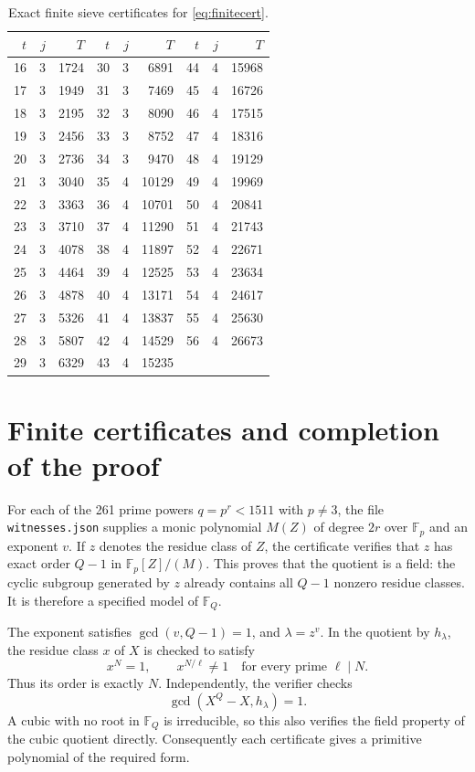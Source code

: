 \documentclass[11pt]{article}
\theoremstyle{remark}\newtheorem{remark}[theorem]{Remark}
\newcommand{\F}{\mathbb F}
\begin{document}
\begin{table}[ht]
\centering\small
\begin{tabular}{rrr@{\qquad}rrr@{\qquad}rrr}
\toprule
$t$&$j$&$T$&$t$&$j$&$T$&$t$&$j$&$T$\\
\midrule
16&3&1724&30&3&6891&44&4&15968\\
17&3&1949&31&3&7469&45&4&16726\\
18&3&2195&32&3&8090&46&4&17515\\
19&3&2456&33&3&8752&47&4&18316\\
20&3&2736&34&3&9470&48&4&19129\\
21&3&3040&35&4&10129&49&4&19969\\
22&3&3363&36&4&10701&50&4&20841\\
23&3&3710&37&4&11290&51&4&21743\\
24&3&4078&38&4&11897&52&4&22671\\
25&3&4464&39&4&12525&53&4&23634\\
26&3&4878&40&4&13171&54&4&24617\\
27&3&5326&41&4&13837&55&4&25630\\
28&3&5807&42&4&14529&56&4&26673\\
29&3&6329&43&4&15235&&&\\
\bottomrule
\end{tabular}
\caption{Exact finite sieve certificates for \eqref{eq:finitecert}.}\label{tab:sieve}
\end{table}

\section{Finite certificates and completion of the proof}

For each of the 261 prime powers $q=p^r<1511$ with $p\ne3$, the file \texttt{witnesses.json} supplies a monic polynomial $M(Z)$ of degree $2r$ over $\F_p$ and an exponent $v$. If $z$ denotes the residue class of $Z$, the certificate verifies that $z$ has exact order $Q-1$ in $\F_p[Z]/(M)$. This proves that the quotient is a field: the cyclic subgroup generated by $z$ already contains all $Q-1$ nonzero residue classes. It is therefore a specified model of $\F_Q$.

The exponent satisfies $\gcd(v,Q-1)=1$, and $\lambda=z^v$. In the quotient by $h_\lambda$, the residue class $x$ of $X$ is checked to satisfy
\begin{equation}\label{eq:ordercert}
 x^N=1,\qquad x^{N/\ell}\ne1\quad\text{for every prime }\ell\mid N.
\end{equation}
Thus its order is exactly $N$. Independently, the verifier checks
\[
 \gcd(X^Q-X,h_\lambda)=1.
\]
A cubic with no root in $\F_Q$ is irreducible, so this also verifies the field property of the cubic quotient directly. Consequently each certificate gives a primitive polynomial of the required form.
\end{document}
